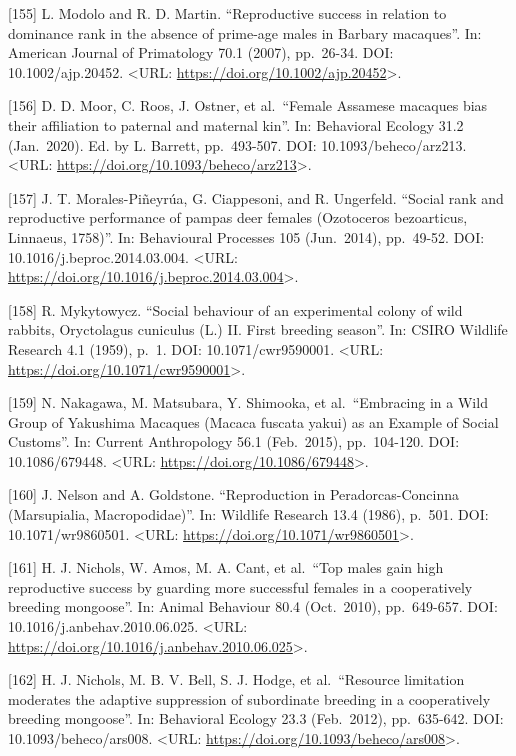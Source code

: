 \documentclass[
]{article}
\begin{document}
{[}155{]} L. Modolo and R. D. Martin. ``Reproductive success in relation
to dominance rank in the absence of prime-age males in Barbary
macaques''. In: American Journal of Primatology 70.1 (2007), pp.~26-34.
DOI: 10.1002/ajp.20452. \textless URL:
\url{https://doi.org/10.1002/ajp.20452}\textgreater.

{[}156{]} D. D. Moor, C. Roos, J. Ostner, et al.~``Female Assamese
macaques bias their affiliation to paternal and maternal kin''. In:
Behavioral Ecology 31.2 (Jan.~2020). Ed. by L. Barrett, pp.~493-507.
DOI: 10.1093/beheco/arz213. \textless URL:
\url{https://doi.org/10.1093/beheco/arz213}\textgreater.

{[}157{]} J. T. Morales-Piñeyrúa, G. Ciappesoni, and R. Ungerfeld.
``Social rank and reproductive performance of pampas deer females
(Ozotoceros bezoarticus, Linnaeus, 1758)''. In: Behavioural Processes
105 (Jun.~2014), pp.~49-52. DOI: 10.1016/j.beproc.2014.03.004.
\textless URL:
\url{https://doi.org/10.1016/j.beproc.2014.03.004}\textgreater.

{[}158{]} R. Mykytowycz. ``Social behaviour of an experimental colony of
wild rabbits, Oryctolagus cuniculus (L.) II. First breeding season''.
In: CSIRO Wildlife Research 4.1 (1959), p.~1. DOI: 10.1071/cwr9590001.
\textless URL: \url{https://doi.org/10.1071/cwr9590001}\textgreater.

{[}159{]} N. Nakagawa, M. Matsubara, Y. Shimooka, et al.~``Embracing in
a Wild Group of Yakushima Macaques (Macaca fuscata yakui) as an Example
of Social Customs''. In: Current Anthropology 56.1 (Feb.~2015),
pp.~104-120. DOI: 10.1086/679448. \textless URL:
\url{https://doi.org/10.1086/679448}\textgreater.

{[}160{]} J. Nelson and A. Goldstone. ``Reproduction in
Peradorcas-Concinna (Marsupialia, Macropodidae)''. In: Wildlife Research
13.4 (1986), p.~501. DOI: 10.1071/wr9860501. \textless URL:
\url{https://doi.org/10.1071/wr9860501}\textgreater.

{[}161{]} H. J. Nichols, W. Amos, M. A. Cant, et al.~``Top males gain
high reproductive success by guarding more successful females in a
cooperatively breeding mongoose''. In: Animal Behaviour 80.4
(Oct.~2010), pp.~649-657. DOI: 10.1016/j.anbehav.2010.06.025.
\textless URL:
\url{https://doi.org/10.1016/j.anbehav.2010.06.025}\textgreater.

{[}162{]} H. J. Nichols, M. B. V. Bell, S. J. Hodge, et al.~``Resource
limitation moderates the adaptive suppression of subordinate breeding in
a cooperatively breeding mongoose''. In: Behavioral Ecology 23.3
(Feb.~2012), pp.~635-642. DOI: 10.1093/beheco/ars008. \textless URL:
\url{https://doi.org/10.1093/beheco/ars008}\textgreater.
\end{document}
